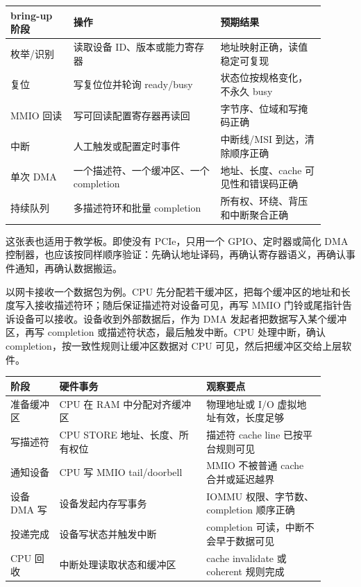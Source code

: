 \begin{longtable}{L{0.18\linewidth}L{0.42\linewidth}L{0.3\linewidth}}
\toprule
bring-up 阶段 & 操作 & 预期结果 \\
\midrule
枚举/识别 & 读取设备 ID、版本或能力寄存器 & 地址映射正确，读值稳定可复现 \\\tablerowrule
复位 & 写复位位并轮询 ready/busy & 状态位按规格变化，不永久 busy \\\tablerowrule
MMIO 回读 & 写可回读配置寄存器再读回 & 字节序、位域和写掩码正确 \\\tablerowrule
中断 & 人工触发或配置定时事件 & 中断线/MSI 到达，清除顺序正确 \\\tablerowrule
单次 DMA & 一个描述符、一个缓冲区、一个 completion & 地址、长度、cache 可见性和错误码正确 \\\tablerowrule
持续队列 & 多描述符环和批量 completion & 所有权、环绕、背压和中断聚合正确 \\
\bottomrule
\end{longtable}

这张表也适用于教学板。即使没有 PCIe，只用一个 GPIO、定时器或简化 DMA 控制器，也应该按同样顺序验证：先确认地址译码，再确认寄存器语义，再确认事件通知，再确认数据搬运。

以网卡接收一个数据包为例。CPU 先分配若干缓冲区，把每个缓冲区的地址和长度写入接收描述符环；随后保证描述符对设备可见，再写 MMIO 门铃或尾指针告诉设备可以接收。设备收到外部数据后，作为 DMA 发起者把数据写入某个缓冲区，再写 completion 或描述符状态，最后触发中断。CPU 处理中断，确认 completion，按一致性规则让缓冲区数据对 CPU 可见，然后把缓冲区交给上层软件。

\begin{longtable}{L{0.14\linewidth}L{0.42\linewidth}L{0.34\linewidth}}
\toprule
阶段 & 硬件事务 & 观察要点 \\
\midrule
准备缓冲区 & CPU 在 RAM 中分配对齐缓冲区 & 物理地址或 I/O 虚拟地址有效，长度足够 \\\tablerowrule
写描述符 & CPU STORE 地址、长度、所有权位 & 描述符 cache line 已按平台规则可见 \\\tablerowrule
通知设备 & CPU 写 MMIO tail/doorbell & MMIO 不被普通 cache 合并或延迟越界 \\\tablerowrule
设备 DMA 写 & 设备发起内存写事务 & IOMMU 权限、字节数、completion 顺序正确 \\\tablerowrule
投递完成 & 设备写状态并触发中断 & completion 可读，中断不会早于数据可见 \\\tablerowrule
CPU 回收 & 中断处理读取状态和缓冲区 & cache invalidate 或 coherent 规则完成 \\
\bottomrule
\end{longtable}

